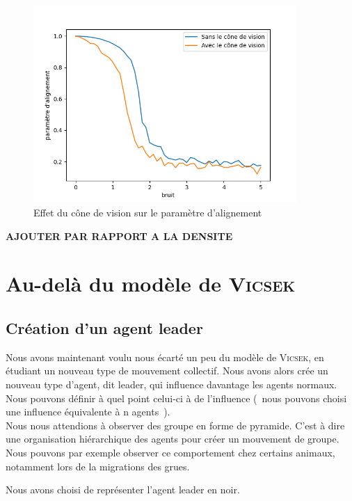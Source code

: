 \documentclass[french, a4paper, 12pt, openany]{report}
\begin{document}
	 \begin{figure}[!h]
		\centering
		\includegraphics[width=10cm]{images/bruit_comparaison[50 mesures par pts].png}
		\caption{Effet du cône de vision sur le paramètre d'alignement}
		\label{cone_vision_alignement}
	\end{figure}
    
    \textbf{AJOUTER PAR RAPPORT A LA DENSITE }
    \section{Au-delà du modèle de \textsc{Vicsek}}
    \subsection{Création d'un agent leader}
       
       Nous avons maintenant voulu nous écarté un peu du modèle de \textsc{Vicsek}, en étudiant un nouveau type de mouvement collectif. Nous avons alors crée un nouveau type d'agent, dit leader, qui influence davantage les agents normaux. Nous pouvons définir à quel point celui-ci à de l'influence (~nous pouvons choisi une influence équivalente à n agents~).\\
       
       Nous nous attendions à observer des groupe en forme de pyramide. C'est à dire une organisation hiérarchique des agents pour créer un mouvement de groupe. Nous pouvons par exemple observer ce comportement chez certains animaux, notamment lors de la migrations des grues. 
       
       Nous avons choisi de représenter l'agent leader en noir.
       
\end{document}

